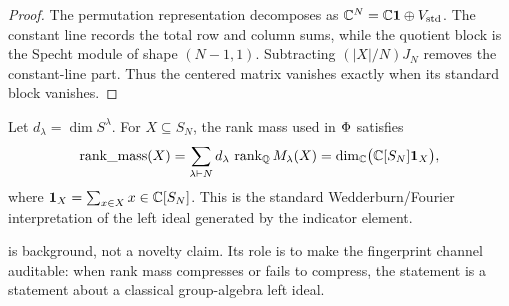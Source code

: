 \begin{proof}
The permutation representation decomposes as \(\mathbb{C}^N=\mathbb{C}\mathbf{1}\oplus V_{\mathrm{std}}\).  The constant line records the total row and column sums, while the quotient block is the Specht module of shape \((N-1,1)\).  Subtracting \((|X|/N)J_N\) removes the constant-line part.  Thus the centered matrix vanishes exactly when its standard block vanishes.
\end{proof}

\begin{proposition}\label{prop:left-ideal-rankmass}
Let \(d_\lambda=\dim S^\lambda\).  For \(X\subseteq S_N\), the rank mass used in \(\Phi\) satisfies
\[
  \operatorname{rank\_mass}(X)=\sum_{\lambda\vdash N} d_\lambda\,\operatorname{rank}_\mathbb{Q}M_\lambda(X)
  =\dim_\mathbb{C}\bigl(\mathbb{C}[S_N] \mathbf{1}_X\bigr),
\]
where \(\mathbf{1}_X=\sum_{x\in X}x\in\mathbb{C}[S_N]\).  This is the standard Wedderburn/Fourier interpretation of the left ideal generated by the indicator element\cite{Serre1977,Diaconis1988}.
\end{proposition}

\begin{remark}
 is background, not a novelty claim.  Its role is to make the fingerprint channel auditable: when rank mass compresses or fails to compress, the statement is a statement about a classical group-algebra left ideal.
\end{remark}
